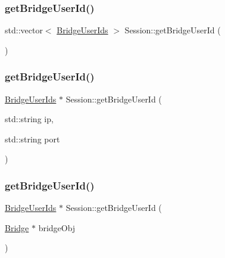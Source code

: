 \mbox{\label{class_session_a6f9e5ceea5b79487e7c9fdbd9f7b2491}} 
\subsubsection{\texorpdfstring{get\+Bridge\+User\+Id()}{getBridgeUserId()}\hspace{0.1cm}{\footnotesize\ttfamily [1/3]}}
{\footnotesize\ttfamily std\+::vector$<$ \hyperlink{class_bridge_user_ids}{Bridge\+User\+Ids} $>$ Session\+::get\+Bridge\+User\+Id (\begin{DoxyParamCaption}{ }\end{DoxyParamCaption})}

\mbox{\label{class_session_a23fa8d97108b7a713ca7dcf9808cccbe}} 
\subsubsection{\texorpdfstring{get\+Bridge\+User\+Id()}{getBridgeUserId()}\hspace{0.1cm}{\footnotesize\ttfamily [2/3]}}
{\footnotesize\ttfamily \hyperlink{class_bridge_user_ids}{Bridge\+User\+Ids} $\ast$ Session\+::get\+Bridge\+User\+Id (\begin{DoxyParamCaption}\item[{std\+::string}]{ip,  }\item[{std\+::string}]{port }\end{DoxyParamCaption})}

\mbox{\label{class_session_a9ffa12700d2c5c76d182def0889bb78f}} 
\subsubsection{\texorpdfstring{get\+Bridge\+User\+Id()}{getBridgeUserId()}\hspace{0.1cm}{\footnotesize\ttfamily [3/3]}}
{\footnotesize\ttfamily \hyperlink{class_bridge_user_ids}{Bridge\+User\+Ids} $\ast$ Session\+::get\+Bridge\+User\+Id (\begin{DoxyParamCaption}\item[{\hyperlink{class_bridge}{Bridge} $\ast$}]{bridge\+Obj }\end{DoxyParamCaption})}

